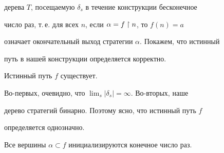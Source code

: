 дерева $T$, посещаемую $\delta_s$ в течение конструкции бесконечное


число раз, т.\,е. для всех $n$, если $\alpha=f\upharpoonright n$, то $f(n)=a$


означает окончательный выход стратегии $\alpha$. Покажем, что истинный


путь в нашей конструкции определяется корректно. 


 


\begin{lems}


Истинный путь $f$ существует.


\end{lems}





\begin{pf}


Во-первых, очевидно, что $\lim_s|\delta_s|=\infty$. Во-вторых, наше


дерево стратегий бинарно. Поэтому ясно, что истинный путь $f$


определяется однозначно.


\end{pf}





\begin{lems}\label{INI}


Все вершины $\alpha\subset f$ инициализируются конечное число раз.


\end{lems}





